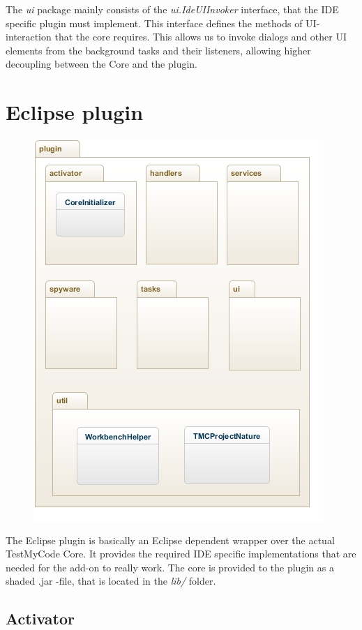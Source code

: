 \documentclass[12pt,a4paper,english,leqno]{article}
\begin{document}
The \textit{ui} package mainly consists of the \textit{ui.IdeUIInvoker} interface, that the IDE specific plugin must implement. This interface defines the methods of UI-interaction that the core requires. This allows us to invoke dialogs and other UI elements from the background tasks and their listeners, allowing higher decoupling between the Core and the plugin.

\pagebreak
\section{Eclipse plugin}

\begin{figure}[ht!]
\centering
\includegraphics[scale=1]{img/plugin.jpg}
\end{figure}

The Eclipse plugin is basically an Eclipse dependent wrapper over the actual TestMyCode Core. It provides the required IDE specific implementations that are needed for the add-on to really work. The core is provided to the plugin as a shaded .jar -file, that is located in the \textit{lib/} folder.

\subsection{Activator}
\end{document}
